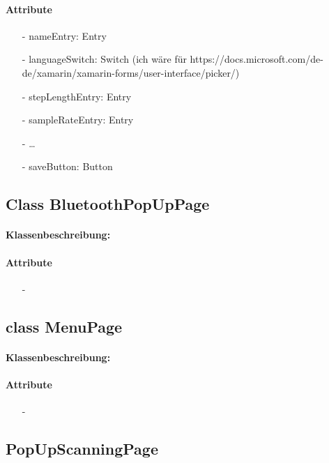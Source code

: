 \documentclass[a4paper,12pt]{article}
\begin{document}
		\paragraph{Attribute}
		\begin{itemize}
			\item [-]nameEntry: Entry
			\item [-]languageSwitch: Switch (ich wäre für https://docs.microsoft.com/de-de/xamarin/xamarin-forms/user-interface/picker/)
			\item [-]stepLengthEntry: Entry
			\item [-]sampleRateEntry: Entry
			\item [-]\dots
			\item [-]saveButton: Button
		\end{itemize}
	
	\subsection{Class BluetoothPopUpPage}
		\paragraph{Klassenbeschreibung:}
		\paragraph{Attribute}
		\begin{itemize}
			\item [-]
		\end{itemize}

	\subsection{class MenuPage}
		\paragraph{Klassenbeschreibung:}
		\paragraph{Attribute}
		\begin{itemize}
			\item [-]
		\end{itemize}

	\subsection{PopUpScanningPage}
\end{document}
